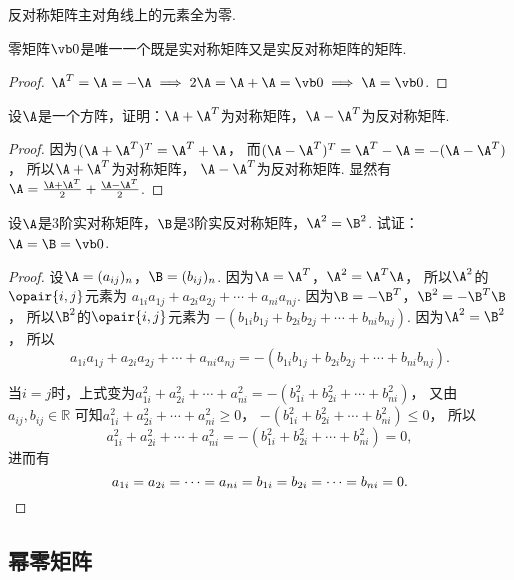 \begin{property}
反对称矩阵主对角线上的元素全为零.
\end{property}

\begin{example}
零矩阵\(\vb0\)是唯一一个既是实对称矩阵又是实反对称矩阵的矩阵.
\begin{proof}
\(\A^T = \A = -\A \implies 2\A = \A+\A = \vb0 \implies \A = \vb0\).
\end{proof}
\end{example}

\begin{example}
设\(\A\)是一个方阵，证明：\(\A+\A^T\)为对称矩阵，\(\A-\A^T\)为反对称矩阵.
\begin{proof}
因为\((\A+\A^T)^T = \A^T+\A\)，
而\((\A-\A^T)^T = \A^T - \A = -(\A-\A^T)\)，
所以\(\A+\A^T\)为对称矩阵，
\(\A-\A^T\)为反对称矩阵.
显然有\(\A = \frac{\A + \A^T}{2} + \frac{\A - \A^T}{2}\).
\end{proof}
\end{example}

\begin{example}
设\(\A\)是3阶实对称矩阵，\(\B\)是3阶实反对称矩阵，\(\A^2 = \B^2\).
试证：\(\A = \B = \vb0\).
\begin{proof}
设\(\A = (a_{ij})_n\)，\(\B = (b_{ij})_n\).
因为\(\A = \A^T\)，\(\A^2 = \A^T \A\)，
所以\(\A^2\)的\(\opair{i,j}\)元素为
\(a_{1i} a_{1j} + a_{2i} a_{2j} + \dotsb + a_{ni} a_{nj}\).
因为\(\B = -\B^T\)，\(\B^2 = -\B^T \B\)，
所以\(\B^2\)的\(\opair{i,j}\)元素为
\(-(b_{1i} b_{1j} + b_{2i} b_{2j} + \dotsb + b_{ni} b_{nj})\).
因为\(\A^2 = \B^2\)，
所以\[
	a_{1i} a_{1j} + a_{2i} a_{2j} + \dotsb + a_{ni} a_{nj}
	= -(b_{1i} b_{1j} + b_{2i} b_{2j} + \dotsb + b_{ni} b_{nj}).
\]

当\(i=j\)时，上式变为\(a_{1i}^2 + a_{2i}^2 + \dotsb + a_{ni}^2
= -(b_{1i}^2 + b_{2i}^2 + \dotsb + b_{ni}^2)\)，
又由\(a_{ij},b_{ij} \in \mathbb{R}\)
可知\(a_{1i}^2 + a_{2i}^2 + \dotsb + a_{ni}^2 \geq 0\)，
\(-(b_{1i}^2 + b_{2i}^2 + \dotsb + b_{ni}^2) \leq 0\)，
所以\[
	a_{1i}^2 + a_{2i}^2 + \dotsb + a_{ni}^2
	= -(b_{1i}^2 + b_{2i}^2 + \dotsb + b_{ni}^2) = 0,
\]
进而有\[
	a_{1i} = a_{2i} = \dotsb = a_{ni} = b_{1i} = b_{2i} = \dotsb = b_{ni} = 0.
	\qedhere
\]
\end{proof}
\end{example}

\subsection{幂零矩阵}


